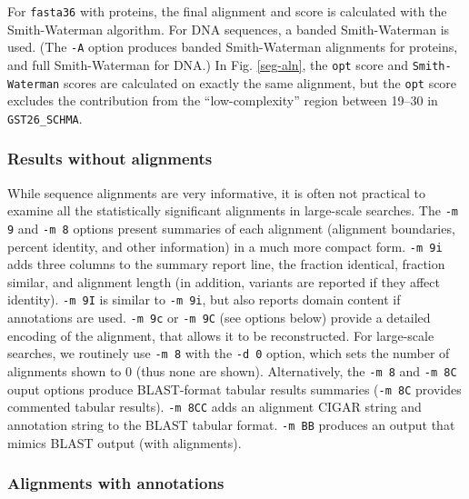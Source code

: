 \documentclass[11pt]{article}
\begin{document}
For \texttt{fasta36} with proteins, the final alignment and score is
calculated with the Smith-Waterman algorithm. For DNA sequences, a
banded Smith-Waterman is used. (The \texttt{-A} option produces banded
Smith-Waterman alignments for proteins, and full Smith-Waterman for
DNA.)  In Fig. \ref{seg-aln}, the \texttt{opt} score and
\texttt{Smith-Waterman} scores are calculated on exactly the same
alignment, but the \texttt{opt} score excludes the contribution from
the ``low-complexity'' region between 19--30 in \texttt{GST26\_SCHMA}.

\subsubsection{Results without alignments}

While sequence alignments are very informative, it is often not
practical to examine all the statistically significant alignments in
large-scale searches. The \texttt{-m 9} and \texttt{-m 8} options
present summaries of each alignment (alignment boundaries, percent
identity, and other information) in a much more compact
form. \texttt{-m 9i} adds three columns to the summary report line,
the fraction identical, fraction similar, and alignment length (in
addition, variants are reported if they affect identity). \texttt{-m
  9I} is similar to \texttt{-m 9i}, but also reports domain content if
annotations are used.  \texttt{-m 9c} or \texttt{-m 9C} (see options
below) provide a detailed encoding of the alignment, that allows it to
be reconstructed. For large-scale searches, we routinely use
\texttt{-m 8} with the \texttt{-d 0} option, which sets the number of
alignments shown to 0 (thus none are shown).  Alternatively, the
\texttt{-m 8} and \texttt{-m 8C} ouput options produce BLAST-format
tabular results summaries (\texttt{-m 8C} provides commented tabular
results).  \texttt{-m 8CC} adds an alignment CIGAR string and
annotation string to the BLAST tabular format.  \texttt{-m BB}
produces an output that mimics BLAST output (with alignments).

\subsubsection{Alignments with annotations}
\end{document}
